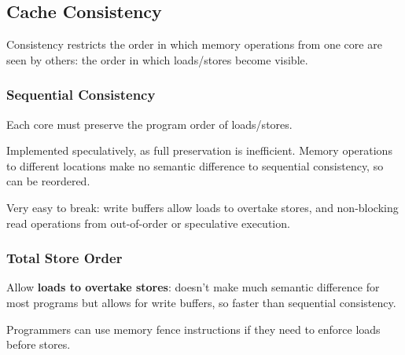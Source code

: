 \documentclass[a4paper,11pt]{article}
\begin{document}
{    \subsection*{Cache Consistency}
    {
        Consistency restricts the order in which memory operations from one core are seen by others: the order in which loads/stores become visible.

        \subsubsection*{Sequential Consistency}
        {
            Each core must preserve the program order of loads/stores.

            Implemented speculatively, as full preservation is inefficient. Memory operations to different locations make no semantic difference to sequential consistency, so can be reordered.

            Very easy to break: write buffers allow loads to overtake stores, and non-blocking read operations from out-of-order or speculative execution.
        }
        \subsubsection*{Total Store Order}
        {
            Allow \textbf{loads to overtake stores}: doesn't make much semantic difference for most programs but allows for write buffers, so faster than sequential consistency.

            Programmers can use memory fence instructions if they need to enforce loads before stores.
        }
    }
}
\end{document}
